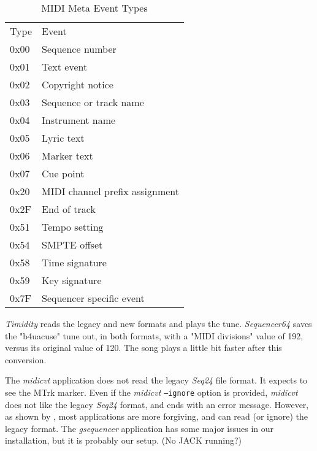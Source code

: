    \begin{table}
      \centering
      \caption{MIDI Meta Event Types}
      \label{table:midi_meta_event_types}
      \begin{tabular}{l l}
         Type	& Event \\
         0x00	& Sequence number \\
         0x01	& Text event \\
         0x02	& Copyright notice \\
         0x03	& Sequence or track name \\
         0x04	& Instrument name \\
         0x05	& Lyric text \\
         0x06	& Marker text \\
         0x07	& Cue point \\
         0x20	& MIDI channel prefix assignment \\
         0x2F	& End of track \\
         0x51	& Tempo setting \\
         0x54	& SMPTE offset \\
         0x58	& Time signature \\
         0x59	& Key signature \\
         0x7F	& Sequencer specific event \\
      \end{tabular}
   \end{table}

   \textsl{Timidity} reads the legacy and new formats and plays the tune.
   \textsl{Sequencer64}  saves the "b4uacuse" tune out, in both formats,
   with a "MIDI divisions" value of 192, versus its original value of 120.
   The song plays a little bit faster after this conversion.

   The \textsl{midicvt} application does not read the legacy \textsl{Seq24}
   file format.  It
   expects to see the MTrk marker.  Even if the \textsl{midicvt}
   \texttt{--ignore} option is provided,
   \textsl{midicvt} does not like the legacy \textsl{Seq24} format, and ends
   with an error message.
   However, as shown by ,
   most applications are more
   forgiving, and can read (or ignore) the legacy format.  The
   \textsl{gsequencer} application has some major issues in our
   installation, but it is probably our setup.  (No JACK running?)

